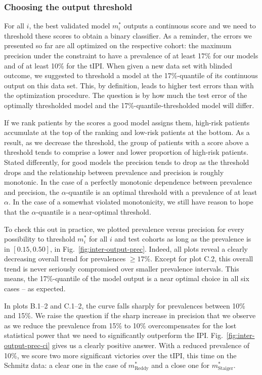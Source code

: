 \subsubsection{Choosing the output threshold}




For all $i$, the best validated model $m_i^*$ outputs a continuous score and we need to threshold 
these scores to obtain a binary classifier. As a reminder, the errors 
we presented so far are all optimized on the respective cohort: the maximum precision under the 
constraint to have a prevalence of at least \num{17}\% for our models and of at least \num{10}\% 
for the tIPI. When given a new data set with blinded outcome, we suggested to threshold a model at 
the \num{17}\%-quantile of its continuous output on this data set. This, by definition, leads to 
higher test errors than with the optimization procedure. The question is by how much the test error 
of the optimally thresholded model and the \num{17}\%-quantile-thresholded model will differ.

If we rank patients by the scores a good model assigns them, high-risk patients accumulate at the 
top of the ranking and low-risk patients at the bottom. As a result, as we decrease the threshold, 
the group of patients with a score above a threshold tends to comprise a lower and lower proportion 
of high-risk patients. Stated differently, for good models the precision tends to drop as the 
threshold drops and the relationship between prevalence and precision is roughly monotonic. In the 
case of a perfectly monotonic dependence between prevalence and precision, the $\alpha$-quantile 
is an optimal threshold with a prevalence of at least $\alpha$. 
In the case of a somewhat violated monotonicity, we still have reason to hope that the 
$\alpha$-quantile is a near-optimal threshold.

To check this out in practice, we plotted prevalence versus precision for every possibility to 
threshold $m^*_i$ for all $i$ and test cohorts as long as the prevalence is in $[\num{0.15}, 
\num{0.50}]$, in Fig.\ \ref{fig:inter-output-prec}.  Indeed, all 
plots reveal a clearly decreasing overall trend for prevalences $\geq \num{17}\%$. 
Except for plot C.2, this overall trend is never seriously compromised over smaller 
prevalence intervals. This means, the \num{17}\%-quantile of the model output is a near optimal 
choice in all six cases -- as expected.

In plots B.1--2 and C.1--2, the curve falls sharply for prevalences between \num{10}\% and \num{15}\%. 
We raise the question if the sharp increase in precision that we observe as we reduce the prevalence 
from \num{15}\% to \num{10}\% overcompensates for the lost statistical power that we need to 
significantly outperform the IPI. Fig.\ \ref{fig:inter-output-prec-ci} gives us a clearly 
positive answer. With a reduced prevalence of \num{10}\%, we score two more significant victories 
over the tIPI, this time on the Schmitz data: a clear one in the case of $m^*_\text{Reddy}$ and a 
close one for $m^*_\text{Staiger}$. 

